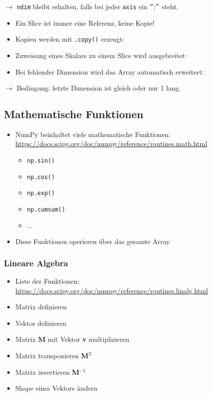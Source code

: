 $\rightarrow$ \texttt{ndim} bleibt erhalten, falls bei jeder \texttt{axis} ein $"$:$"$ steht.
\begin{itemize}
	\item Ein Slice ist immer eine Referenz, keine Kopie!
	
	\item Kopien werden mit \texttt{.copy()} erzeugt:
	
	\item Zuweisung eines Skalars zu einem Slice wird ausgebreitet:
	
	\item Bei fehlender Dimension wird das Array automatisch erweitert:
	
\end{itemize}
$\rightarrow$ Bedingung: letzte Dimension ist gleich oder nur 1 lang.

\subsection{Mathematische Funktionen}
\begin{itemize}
	\item NumPy beinhaltet viele mathematische Funktionen:\\
	\url{https://docs.scipy.org/doc/numpy/reference/routines.math.html}
	\begin{itemize}
		\item \texttt{np.sin()}
		\item \texttt{np.cos()}
		\item \texttt{np.exp()}
		\item \texttt{np.cumsum()}
		\item ...
	\end{itemize}
	\item Diese Funktionen operieren über das gesamte Array
	
\end{itemize}

\subsubsection{Lineare Algebra}
\begin{itemize}
	\item Liste der Funktionen:\\
	\url{https://docs.scipy.org/doc/numpy/reference/routines.linalg.html}
	\item Matrix definieren
	
	\item Vektor definieren
	
	\item Matrix \textbf{M} mit Vektor \textbf{v} multiplizieren
	
	\item Matrix transponieren \textbf{M$^T$}
	
	\item Matrix invertieren \textbf{M$^{-1}$}
	
	\item Shape eines Vektors ändern
	
\end{itemize}

